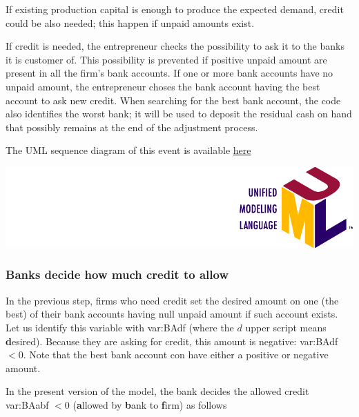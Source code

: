 \documentclass{book}
\newcommand{\doclocation}{file:///Users/giulioni/Documents/workspace/gabriele/docs}
\begin{document}
If existing production capital is enough to produce the expected demand, credit could be also needed; this happen if unpaid amounts exist.

If credit is needed, the entrepreneur checks the possibility to ask it to the banks it is customer of. This possibility is prevented if positive unpaid amount are present in all the firm's bank accounts. If one or more bank accounts have no unpaid amount, the entrepreneur choses the bank account having the best account to ask new credit. 
When searching for the best bank account, the code also identifies the worst bank; it will be used to deposit the residual cash on hand that possibly remains at the end of the adjustment process. 

The UML sequence diagram of this event is available \href{\doclocation/umldoc/setDesiredCredit.html}{here}
\begin{marginfigure}
	\includegraphics[scale=0.1]{uml.png}
\end{marginfigure}

\subsubsection{Banks decide how much credit to allow}

In the previous step, firms who need credit set the desired amount on one (the best) of their bank accounts having null unpaid amount if such account exists. Let us identify this variable with \gls{var:BAdf} (where the $d$ upper script means \textbf desired). Because they are asking for credit, this amount is negative: \gls{var:BAdf} $<0$. Note that the best bank account con have either a positive or negative amount. 

In the present version of the model, the bank decides the allowed credit \gls{var:BAabf} $<0$ (\textbf allowed by \textbf bank to \textbf firm) as follows
\end{document}
